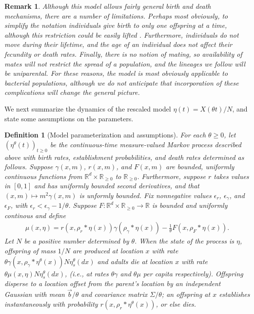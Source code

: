 \documentclass[12pt]{article}
\newtheorem{remark}[theorem]{Remark}
\newtheorem{definition}[theorem]{Definition}
\newcommand{\IR}{\mathbb R}
\newcommand{\meanq}{\vec b}    %
\newcommand{\covq}{\Sigma}     %
\newcommand{\kernel}{\rho}  %
\newcommand{\smooth}[1]{\kernel_{#1} \! * \!}  %
\begin{document}
\begin{remark}
Although this model allows fairly general birth and death mechanisms,
there are a number of limitations.
Perhaps most obviously, to simplify the notation
individuals give birth to only one offspring at a time,
although this restriction could be easily lifted
\citep[as in][]{etheridge/kurtz:2018}.
Furthermore, individuals do not move during their lifetime,
and the age of an individual does not affect their fecundity or death rates.
Finally, there is no notion of mating,
so availability of mates will not restrict the spread of a population,
and the lineages we follow will be uniparental.
For these reasons, the model is most obviously applicable to bacterial populations,
although we do not anticipate that incorporation of these complications
will change the general picture.
\end{remark}

We next summarize the dynamics of the rescaled model $\eta(t) = X(\theta t)/N$,
and state some assumptions on the parameters.

\begin{definition}[Model parameterization and assumptions]
    \label{def:model_setup}
    For each $\theta \ge 0$,
    let $\left(\eta^\theta(t)\right)_{t \ge 0}$
    be the continuous-time measure-valued Markov process described above
    with birth rates, establishment probabilities, and death rates
    determined as follows.
    Suppose $\gamma(x, m)$, $r(x, m)$, and $F(x, m)$
    are bounded, uniformly continuous functions
    from $\IR^d \times \IR_{\ge 0}$ to $\IR_{\ge 0}$.
    Furthermore, suppose $r$ takes values in $[0, 1]$
    and has uniformly bounded second derivatives,
    and that $(x, m) \mapsto m^2 \gamma(x, m)$ is unformly bounded.
    Fix nonnegative values $\epsilon_r$, $\epsilon_\gamma$, and $\epsilon_F$,
    with $\epsilon_r < \epsilon_\gamma - 1/\theta$.
    Suppose $F: \IR^d \times \IR_{\ge 0} \to \IR$ is bounded and uniformly continous
    and define
    \begin{align}
        \mu(x, \eta)
        =
        r(x, \smooth{r} \eta(x))
        \gamma(\smooth{\gamma} \eta(x))
        - \frac{1}{\theta}
        F(x, \smooth{F} \eta(x)) .
    \end{align}
    Let $N$ be a positive number determined by $\theta$.
    When the state of the process is $\eta$,
    offspring of mass $1/N$ are produced at location $x$
    with rate $\theta \gamma(x, \smooth{\gamma} \eta^{\theta}(x)) N \eta^{\theta}_s(dx)$
    and adults die at location $x$ with rate $\theta \mu(x, \eta) N \eta^{\theta}_s(dx)$,
    (i.e., at rates $\theta \gamma$ and $\theta \mu$ per capita respectively).
    Offspring disperse to a location offset from the parent's location
    by an independent Gaussian with mean $\meanq/\theta$
    and covariance matrix $\covq / \theta$;
    an offspring at $x$ establishes instantaneously
    with probability $r(x, \smooth{r} \eta^{\theta}(x))$, or else dies.
\end{definition}
\end{document}
